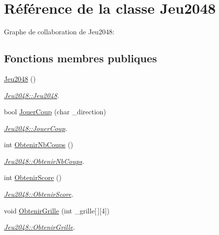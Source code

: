 \hypertarget{class_jeu2048}{}\section{Référence de la classe Jeu2048}
\label{class_jeu2048}


Graphe de collaboration de Jeu2048\+:
\subsection*{Fonctions membres publiques}
\begin{DoxyCompactItemize}
\item 
\hyperlink{class_jeu2048_a851bd5ce17939b16a6a3182b09866b73}{Jeu2048} ()
\begin{DoxyCompactList}\small\item\em \hyperlink{class_jeu2048_a851bd5ce17939b16a6a3182b09866b73}{Jeu2048\+::\+Jeu2048}. \end{DoxyCompactList}\item 
bool \hyperlink{class_jeu2048_aa5dec4b17eabdb7afaca0b742e3c6497}{Jouer\+Coup} (char \+\_\+direction)
\begin{DoxyCompactList}\small\item\em \hyperlink{class_jeu2048_aa5dec4b17eabdb7afaca0b742e3c6497}{Jeu2048\+::\+Jouer\+Coup}. \end{DoxyCompactList}\item 
int \hyperlink{class_jeu2048_a1537ec04b34f441f550de121d1e08e89}{Obtenir\+Nb\+Coups} ()
\begin{DoxyCompactList}\small\item\em \hyperlink{class_jeu2048_a1537ec04b34f441f550de121d1e08e89}{Jeu2048\+::\+Obtenir\+Nb\+Coups}. \end{DoxyCompactList}\item 
int \hyperlink{class_jeu2048_a2a1383b8477b76c805f0f7d88a76820d}{Obtenir\+Score} ()
\begin{DoxyCompactList}\small\item\em \hyperlink{class_jeu2048_a2a1383b8477b76c805f0f7d88a76820d}{Jeu2048\+::\+Obtenir\+Score}. \end{DoxyCompactList}\item 
void \hyperlink{class_jeu2048_a698339c78f6285b6c218c2901e3a1100}{Obtenir\+Grille} (int \+\_\+grille\mbox{[}$\,$\mbox{]}\mbox{[}4\mbox{]})
\begin{DoxyCompactList}\small\item\em \hyperlink{class_jeu2048_a698339c78f6285b6c218c2901e3a1100}{Jeu2048\+::\+Obtenir\+Grille}. \end{DoxyCompactList}\end{DoxyCompactItemize}
